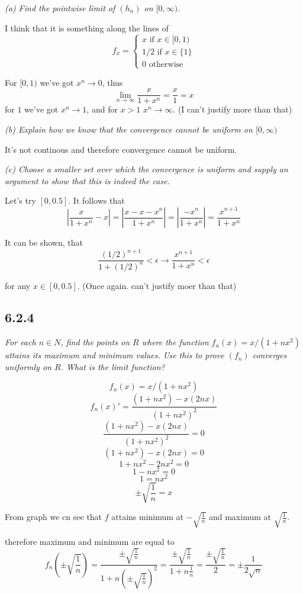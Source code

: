 \documentclass[11pt,oneside,titlepage]{book}
\begin{document}
\textit{(a) Find the pointwise limit of $(h_n)$ on $[0, \infty)$.}

I think that it is something along the lines of
$$
f_x =
\begin{cases}
  x \text{ if } x \in [0, 1) \\
  1/2 \text{ if } x \in \{1\} \\
  0 \text{ otherwise }
\end{cases}
$$

For $[0, 1)$ we've got $x^n \to 0$, thus
$$\lim_{n \to \infty}{\frac{x}{1 + x^n}} = \frac{x}{1} = x$$
for $1$ we've got $x^n \to 1$, and for $x > 1$ $x^n \to \infty$.
(I can't justify more than that)

\textit{(b) Explain how we know that the convergence cannot be uniform
  on $[0, \infty)$}

It's not continous and therefore convergence cannot be uniform.

\textit{(c) Choose a smaller set over which the convergence is uniform and
  supply an argument to show that this is indeed the case.}

Let's try $[0, 0.5]$. It follows that
$$\left|\frac{x}{1 + x^n} - x\right|  =
\left|\frac{x - x - x^n}{1 + x^n}\right|  =
\left|\frac{ - x^n}{1 + x^n}\right|  =
\frac{ x^{n + 1}}{1 + x^n} 
$$

It can be shown, that
$$\frac{ (1/2)^{n + 1}}{1 + (1/2)^n} < \epsilon \to
\frac{ x^{n + 1}}{1 + x^n} < \epsilon
$$ 

for any $x \in [0, 0.5]$. (Once again. can't justify moer than that)


\subsection*{6.2.4}
\textit{For each $n \in N$, find the points on $R$ where the function
  $f_n(x) = x/(1 + nx^2)$ attains its maximum and minimum values. Use this
  to prove $(f_n)$ converges uniformly on $R$. What is the limit function?}

$$f_n(x) = x/(1 + nx^2)$$
$$f_n(x)' = \frac{(1 + nx^2) - x(2nx)}{(1 + nx^2)^2}$$
$$\frac{(1 + nx^2) - x(2nx)}{(1 + nx^2)^2} = 0$$
$$(1 + nx^2) - x(2nx) = 0$$
$$1 + nx^2 - 2nx^2 = 0$$
$$1 - nx^2 = 0$$
$$1 = nx^2$$
$$\pm \sqrt{\frac{1}{n}} = x$$

From graph we cn see that $f$ attains minimum at $-\sqrt{\frac{1}{n}}$
and maximum at $\sqrt{\frac{1}{n}}$.

therefore maximum and minimum are equal to 
$$f_n(\pm \sqrt{\frac{1}{n}}) = \frac{\pm \sqrt{\frac{1}{n}}}
{1 + n(\pm \sqrt{\frac{1}{n}})^2} =
\frac{\pm \sqrt{\frac{1}{n}}} {1 + n\frac{1}{n}} =
\frac{\pm \sqrt{\frac{1}{n}}} {2} =
\pm \frac{1}{2\sqrt{n}} $$
\end{document}

